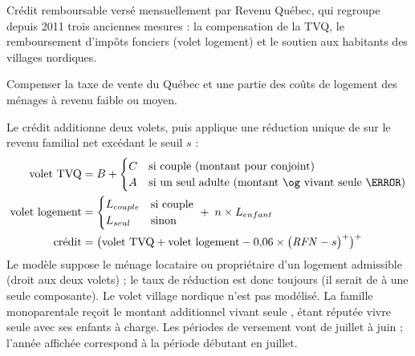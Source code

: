 
\pdesc Crédit remboursable versé mensuellement par Revenu Québec, qui
regroupe depuis 2011 trois anciennes mesures : la compensation de la TVQ, le
remboursement d'impôts fonciers (volet logement) et le soutien aux
habitants des villages nordiques.

\pobj Compenser la taxe de vente du Québec et une partie des coûts de
logement des ménages à revenu faible ou moyen.

\pregle Le crédit additionne deux volets, puis applique une réduction unique
de  sur le revenu familial net excédant le seuil $s$ :
\begin{align*}
\text{volet TVQ} &= B + \begin{cases}
C & \text{si couple (montant pour conjoint)} \\
A & \text{si un seul adulte (montant \og vivant seule \fg{})}
\end{cases} \\
\text{volet logement} &= \begin{cases}
L_{couple} & \text{si couple} \\
L_{seul} & \text{sinon}
\end{cases} \;+\; n \times L_{enfant} \\
\text{crédit} &= \pos{\text{volet TVQ} + \text{volet logement}
 - 0{,}06 \times \pos{\RFN - s}}
\end{align*}
Le modèle suppose le ménage locataire ou propriétaire d'un logement
admissible (droit aux deux volets) ; le taux de réduction est donc toujours
 (il serait de  à une seule composante). Le volet
\og village nordique \fg{} n'est pas modélisé. La famille monoparentale
reçoit le montant additionnel \og vivant seule \fg{}, étant réputée vivre
seule avec ses enfants à charge. Les périodes de versement vont de juillet à
juin ; l'année affichée correspond à la période débutant en juillet.

\pparams

